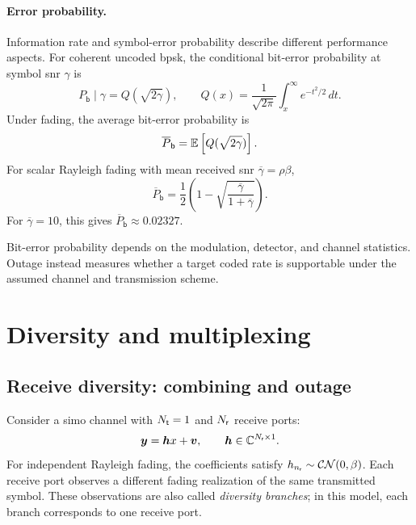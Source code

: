 \paragraph{Error probability.}
Information rate and symbol-error probability
describe different performance aspects.
For coherent uncoded \ac{bpsk}, the conditional
bit-error probability at symbol \ac{snr}
$\gamma$ is
\begin{equation*}
	P_{\mathsf b}\mid\gamma
	=Q(\sqrt{2\gamma}),
	\qquad
	Q(x)=\frac{1}{\sqrt{2\pi}}
	\int_x^\infty e^{-t^2/2}\,dt.
\end{equation*}
Under fading, the average bit-error probability is
\begin{equation*}
	\overline P_{\mathsf b}
	=\mathbb{E}\left[Q(\sqrt{2\gamma})\right].
\end{equation*}
For scalar Rayleigh fading with mean received
\ac{snr} $\overline\gamma=\rho\beta$,
\begin{equation}\label{eq:ber}
	\boxed{
		\overline P_{\mathsf b}
		=\frac12\left(
		1-\sqrt{
			\frac{\overline\gamma}{1+\overline\gamma}
		}
		\right).
	}
\end{equation}
For $\overline\gamma=10$, this gives
$\overline P_{\mathsf b}\approx0.02327$.

Bit-error probability depends on the modulation,
detector, and channel statistics.
Outage instead measures whether a target coded
rate is supportable under the assumed channel
and transmission scheme.


\section{Diversity and multiplexing}
\label{sec:diversity}

\subsection{Receive diversity: combining and outage}

Consider a \ac{simo} channel with $N_{\mathsf{t}}=1$ and $N_{\mathsf{r}}$ receive ports:
\begin{equation*}
	\bm{y}=\bm{h}x+\bm{v},
	\qquad
	\bm{h}\in\mathbb{C}^{N_{\mathsf{r}}\times1}.
\end{equation*}
For independent Rayleigh fading, the coefficients satisfy $h_{n_{\mathsf{r}}}\sim\mathcal{CN}(0,\beta)$. Each receive port observes a different fading realization of the same transmitted symbol. These observations are also called \emph{diversity branches}; in this model, each branch corresponds to one receive port.

